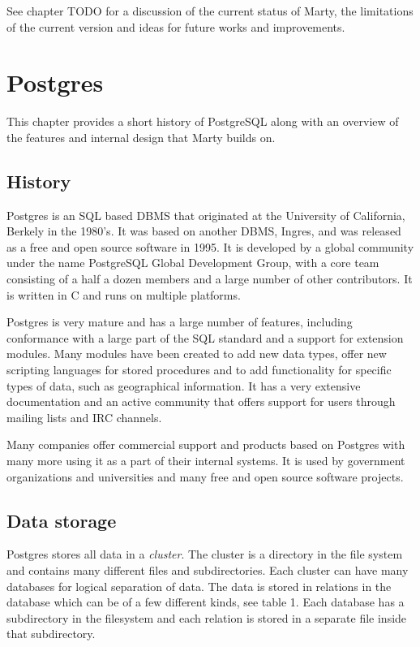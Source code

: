\documentclass[a4paper,12pt,twoside,BCOR=10mm]{scrbook}
\begin{document}
See chapter TODO for a discussion of the current status of Marty, the limitations of the current version and ideas for future works and improvements.


\chapter{Postgres}
This chapter provides a short history of PostgreSQL along with an overview of the features and internal design that Marty builds on.

\section{History}
Postgres is an SQL based DBMS that originated at the University of California, Berkely in the 1980's. It was based on another DBMS, Ingres, and was released as a free and open source software in 1995. It is developed by a global community under the name PostgreSQL Global Development Group, with a core team consisting of a half a dozen members and a large number of other contributors. It is written in C and runs on multiple platforms.

Postgres is very mature and has a large number of features, including conformance with a large part of the SQL standard and a support for extension modules. Many modules have been created to add new data types, offer new scripting languages for stored procedures and to add functionality for specific types of data, such as geographical information. It has a very extensive documentation and an active community that offers support for users through mailing lists and IRC channels.

Many companies offer commercial support and products based on Postgres with many more using it as a part of their internal systems. It is used by government organizations and universities and many free and open source software projects.

\section{Data storage}
Postgres stores all data in a \textit{cluster}. The cluster is a directory in the file system and contains many different files and subdirectories. Each cluster can have many databases for logical separation of data. The data is stored in relations in the database which can be of a few different kinds, see table 1. Each database has a subdirectory in the filesystem and each relation is stored in a separate file inside that subdirectory.
\end{document}
